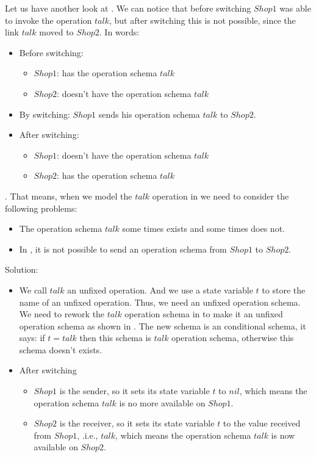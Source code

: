 Let us have another look at . We can notice that before switching $Shop1$ was able to invoke the operation $talk$, but after switching this is not possible, since the link $talk$ moved to $Shop2$. In \oz{} words:
\begin{itemize}
\item Before switching:
	\begin{itemize}
	\item $Shop1$: has the operation schema $talk$
	\item $Shop2$: doesn't have the operation schema $talk$
	\end{itemize}
\item By switching: $Shop1$ sends his operation schema $talk$ to $Shop2$.
\item After switching:
	\begin{itemize}
	\item $Shop1$: doesn't have the operation schema $talk$
	\item $Shop2$: has the operation schema $talk$
	\end{itemize}
\end{itemize}
. That means, when we model the $talk$ operation in \oz{} we need to consider the following problems: 

\begin{itemize}
\item The operation schema $talk$ some times exists and some times does not.
\item In \oz{}, it is not possible to send an operation schema from $Shop1$ to $Shop2$.
\end{itemize}
Solution:
\begin{itemize}
\item We call $talk$ an unfixed operation. And we use a state variable $t$ to store the name of an unfixed operation. Thus, we need an unfixed operation schema. We need to rework the $talk$ operation schema in  to make it an unfixed operation schema as shown in . The new schema is an conditional schema, it says: if $t = talk$ then this schema is $talk$ operation schema, otherwise this schema doesn't exists.
\item After switching 
\begin{itemize}
\item $Shop1$ is the sender, so it sets its state variable $t$ to $nil$, which means the operation schema $talk$ is no more available on $Shop1$.
\item $Shop2$ is the receiver, so it sets its state variable $t$ to the value received from $Shop1$, .i.e., $talk$, which means the operation schema $talk$ is now available on $Shop2$.
\end{itemize}

\end{itemize}


